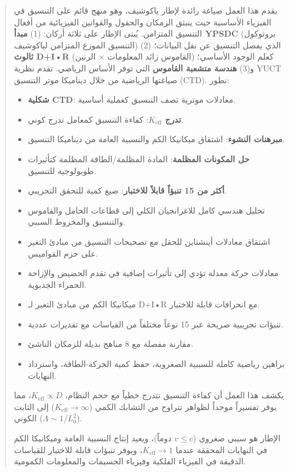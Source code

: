 \documentclass[11pt,a4paper]{article}
\begin{document}
	\begin{abstract}
		يقدم هذا العمل صياغة رائدة لإطار ياكوشيف، وهو منهج قائم على التنسيق في الفيزياء الأساسية حيث ينبثق الزمكان والحقول والقوانين الفيزيائية من أفعال التنسيق المتزامن. يُبنى الإطار على ثلاثة أركان: (1) \textbf{مبدأ YPSDC} (بروتوكول التنسيق الموزع المتزامن لياكوشيف) الذي يفصل التنسيق عن نقل البيانات؛ (2) \textbf{ثالوث D+I•R} (القاموس زائد المعلومات × الرنين) كعلم الوجود الأساسي؛ و(3) \textbf{هندسة متشعبة القاموس} التي توفر الأساس الرياضي. تقدم نظرية YUCT صياغتها الرياضية من خلال ديناميكا موتر التنسيق (CTD). نطور:
		\begin{itemize}
			\item \textbf{شكلية CTD}: معادلات موترية تصف التنسيق كعملية أساسية.
			\item \textbf{تدرج $K_{\mathrm{eff}}$}: كفاءة التنسيق كمعامل تدرج كوني.
			\item \textbf{مبرهنات النشوء}: اشتقاق ميكانيكا الكم والنسبية العامة من ديناميكا التنسيق.
			\item \textbf{حل المكونات المظلمة}: المادة المظلمة/الطاقة المظلمة كتأثيرات طوبولوجية للتنسيق.
			\item \textbf{أكثر من 15 تنبؤاً قابلاً للاختبار}: صيغ كمية للتحقق التجريبي.
			\item تحليل هندسي كامل للاغرانجيان الكلي إلى قطاعات الحامل والقاموس والتنسيق والمخروط السببي.
			\item اشتقاق معادلات أينشتاين للحقل مع تصحيحات التنسيق من مبادئ التغير على حزم القواميس.
			\item معادلات حركة معدلة تؤدي إلى تأثيرات إضافية في تقدم الحضيض والإزاحة الحمراء الجذبوية.
			\item ميكانيكا الكم من مبادئ التغير لـ D+I•R مع انحرافات قابلة للاختبار.
			\item تنبؤات تجريبية صريحة عبر 15 نوعاً مختلفاً من القياسات مع تقديرات عددية.
			\item مقارنة مفصلة مع 8 مناهج بديلة للزمكان الناشئ.
			\item براهين رياضية كاملة للسببية الصغروية، حفظ كمية الحركة-الطاقة، واسترداد النهايات.
		\end{itemize}
		يكشف هذا العمل أن كفاءة التنسيق تتدرج خطياً مع حجم النظام، $K_{\mathrm{eff}} \propto D$، مما يوفر تفسيراً موحداً لظواهر تتراوح من التشابك الكمي ($K_{\mathrm{eff}} \to \infty$) إلى الثابت الكوني ($\Lambda \sim 1/L_0^2$).
		
		الإطار هو سببي صغروي ($v \leq c$ دوماً)، ويعيد إنتاج النسبية العامة وميكانيكا الكم في النهايات المحققة عندما $K_{\mathrm{eff}} \to 1$، ويوفر تنبؤات قابلة للاختبار للقياسات الدقيقة في الفيزياء الفلكية وفيزياء الجسيمات والمعلومات الكمومية.
		

\end{abstract}
\end{document}
